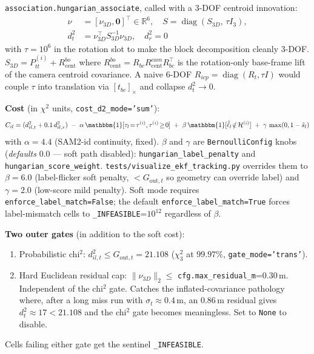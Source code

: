 \documentclass[11pt]{article}
\newcommand{\ind}{\mathbbm{1}}
\newcommand{\R}{\mathbb{R}}
\newcommand{\code}[1]{\texttt{\small #1}}
\begin{document}
\code{association.hungarian\_associate}, called with a 3-DOF centroid
innovation:
\begin{align}
   \nu &= [\nu_{3D},\bm 0]^{\!\top}\in\R^6, \quad
   S = \operatorname{diag}(S_{3D},\,\tau I_3), \\
   d^2_t &= \nu_{3D}^{\!\top}S_{3D}^{-1}\nu_{3D}, \quad d^2_r=0
\end{align}
with $\tau=10^6$ in the rotation slot to make the block decomposition
cleanly 3-DOF. $S_{3D}=P^{(i)}_{tt}+R^{bo}_{\text{cent}}$ where
$R^{bo}_{\text{cent}}=R_{bc}R^{cam}_{\text{cent}}R_{bc}^{\!\top}$ is
the rotation-only base-frame lift of the camera centroid covariance.
A naive 6-DOF $R_{icp}=\operatorname{diag}(R_t,\tau I)$ would couple
$\tau$ into translation via $[t_{bc}]_{\!\times}$ and collapse $d^2_t\to 0$.

\textbf{Cost} (in $\chi^2$ units, \code{cost\_d2\_mode='sum'}):
\begin{equation}\label{eq:cost}
   C_{il} = (d^2_{il,t}+0.1\,d^2_{il,r})
      \;-\;\alpha\,\ind[\tau_l\!=\!\tau^{(i)},\tau^{(i)}\!\ge\!0]
      \;+\;\beta\,\ind[\hat\ell_l\!\notin\!\mathcal H^{(i)}]
      \;+\;\gamma\,\max(0,1-\hat s_l)
\end{equation}
with $\alpha\!=\!4.4$ (SAM2-id continuity, fixed). $\beta$ and $\gamma$
are \code{BernoulliConfig} knobs (\emph{defaults} 0.0 — soft path
disabled): \code{hungarian\_label\_penalty} and
\code{hungarian\_score\_weight}. \code{tests/visualize\_ekf\_tracking.py}
overrides them to $\beta\!=\!6.0$ (label-flicker soft penalty,
$<G_{\text{out},t}$ so geometry can override label) and $\gamma\!=\!2.0$
(low-score mild penalty). Soft mode requires
\code{enforce\_label\_match=False}; the default
\code{enforce\_label\_match=True} forces label-mismatch cells to
\code{\_INFEASIBLE}=$10^{12}$ regardless of $\beta$.

\textbf{Two outer gates} (in addition to the soft cost):
\begin{enumerate}[leftmargin=1.5em,itemsep=0pt,topsep=2pt]
\item Probabilistic chi$^2$: $d^2_{il,t}\le G_{\text{out},t}=21.108$
   ($\chi^2_3$ at $99.97\%$, \code{gate\_mode='trans'}).
\item Hard Euclidean residual cap: $\|\nu_{3D}\|_2 \le $
   \code{cfg.max\_residual\_m}=$0.30$\,m. Independent of the chi$^2$
   gate. Catches the inflated-covariance pathology where, after a long
   miss run with $\sigma_t\!\approx\!0.4$\,m, an $0.86$\,m residual
   gives $d^2_t\!\approx\!17 < 21.108$ and the chi$^2$ gate becomes
   meaningless. Set to \code{None} to disable.
\end{enumerate}
Cells failing either gate get the sentinel \code{\_INFEASIBLE}.
\end{document}
